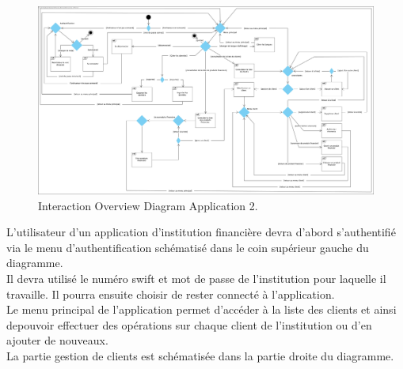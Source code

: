 \documentclass[../rapport.tex]{subfiles}
\begin{document}
\begin{figure}[h!]
	\centering \includegraphics[scale=0.20]{ressources/photos_diagrammes/app2/int_over_app2.jpg}
	\caption{Interaction Overview Diagram Application 2.}
\end{figure}

L'utilisateur d'un application d'institution financière devra d'abord s'authentifié via le menu d'authentification schématisé dans le coin supérieur gauche du diagramme.\\
Il devra utilisé le numéro swift et mot de passe de l'institution pour laquelle il travaille. Il pourra ensuite choisir de rester connecté à l'application.\\
Le menu principal de l'application permet d'accéder à la liste des clients et ainsi depouvoir effectuer des opérations sur chaque client de l'institution ou d'en ajouter de nouveaux.\\
La partie gestion de clients est schématisée dans la partie droite du diagramme.
\end{document}
